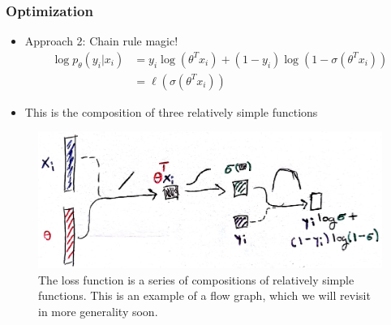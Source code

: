 \documentclass[10pt,mathserif]{beamer}
\begin{document}
\begin{frame}
  \frametitle{Optimization}
  \begin{itemize}
  \item Approach 2: Chain rule magic!
    \begin{align*}
      \log p_{\theta}\left(y_i \vert x_i\right)  &= y_i \log\left(\theta^T x_i\right) + \left(1 - y_i\right) \log\left(1 - \sigma\left(\theta^T x_i\right)\right) \\
      &= \ell\left(\sigma\left(\theta^T x_{i}\right)\right)
    \end{align*}
  \item This is the composition of three relatively simple functions
  \end{itemize}
\begin{figure}[ht]
  \centering
  \includegraphics[width=0.7\paperwidth]{figure/logistic_comp_graph}
  \caption{The loss function is a series of compositions of relatively simple
    functions. This is an example of a flow graph, which we will revisit in more
    generality soon.
    \label{fig:logistic_comp_graph} }
\end{figure}
\end{frame}
\end{document}
